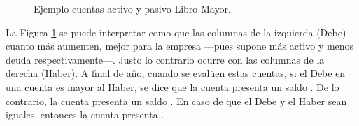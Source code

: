 \begin{figure}[H]
    \centering
    \hspace{2cm} %
    \caption{Ejemplo cuentas activo y pasivo Libro Mayor.}
    \label{LMAP}
\end{figure}

La Figura \ref{LMAP} se puede interpretar como que las columnas de la izquierda (Debe) cuanto más aumenten, mejor para  la empresa ---pues supone más activo y menos deuda respectivamente---. Justo lo contrario ocurre con las columnas de la derecha (Haber). A final de año, cuando se evalúen estas cuentas, si el Debe en una cuenta es mayor al Haber, se dice que la cuenta presenta un saldo . De lo contrario, la cuenta presenta un saldo . En caso de que el Debe y el Haber sean iguales, entonces la cuenta presenta .

\bigskip


